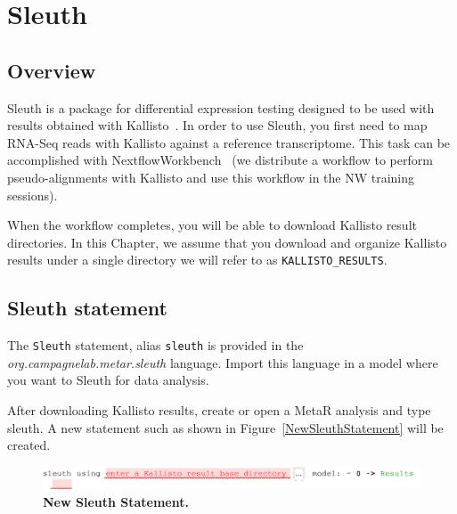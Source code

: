 

\chapter{Sleuth}\label{chap:Sleuth}

\section{Overview}
Sleuth is a package for differential expression testing designed to be used with results obtained with Kallisto~\cite{bray2016near}. In order to use Sleuth, you first need to map RNA-Seq reads with Kallisto against a reference transcriptome. This task can be accomplished with NextflowWorkbench~\cite{kurs2016nextflowworkbench} (we distribute a workflow to perform pseudo-alignments with Kallisto and use this workflow in the NW training sessions). 


When the workflow completes, you will be able to download Kallisto result directories. In this Chapter, we assume that you download and organize Kallisto results under a single directory we will refer to as  \texttt{KALLISTO\_RESULTS}.

\section{Sleuth statement}
The \texttt{Sleuth} statement, alias \texttt{sleuth} is provided in the \textit{org.campagnelab.metar.sleuth} language. Import this language in a model where you want to Sleuth for data analysis.

After downloading Kallisto results, create or open a MetaR analysis and type sleuth. A new statement such as shown in Figure~\ref{NewSleuthStatement} will be created.

\begin{figure}[h!tbp]
  \centering
  \includegraphics[width=\figWidthWide]{figures/NewSleuthStatement-1.pdf}
\caption[New Sleuth Statement.]{\textbf{New Sleuth Statement.}}
\label{fig:NewSleuthStatement}
\end{figure}

